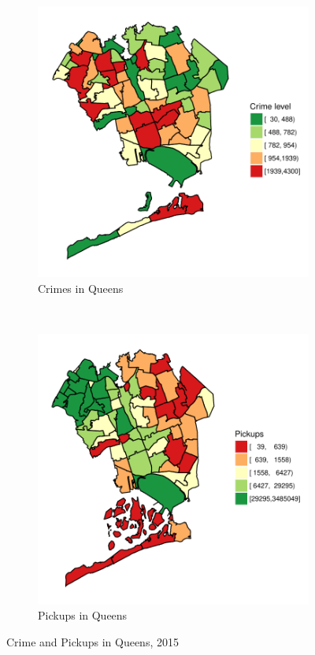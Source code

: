 \documentclass[10pt,ignorenonframetext,]{beamer}
\begin{document}
\begin{frame}

\begin{figure}
  \label{fig:zones}
    \centering
    \begin{subfigure}[t]{0.45\textwidth}
        \centering
        \label{fig:zones_shape}
        \includegraphics[width=1\textwidth]{../img/crimes_per_zone_2015_Queens}
        \caption{Crimes in Queens}
    \end{subfigure}%
    ~ 
    \begin{subfigure}[t]{0.45\textwidth}
        \centering
        \label{fig:zones_raster}
        \includegraphics[width=1\textwidth]{../img/taxis_2015_Queens}
        \caption{Pickups in Queens}
    \end{subfigure}
    \caption{Crime and Pickups in Queens, 2015}
  \end{figure}


\end{frame}
\end{document}
